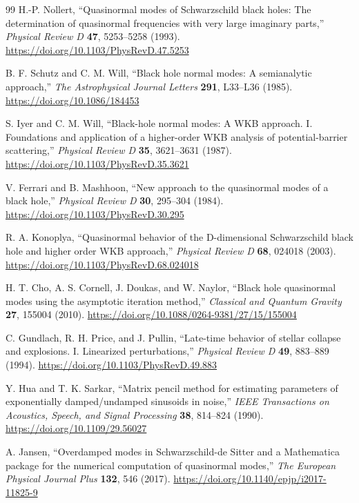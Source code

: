 \documentclass[12pt,a4paper]{article}
\begin{document}
\begin{thebibliography}{99}
\color{blue}
H.-P. Nollert,
``Quasinormal modes of Schwarzschild black holes: The determination of
quasinormal frequencies with very large imaginary parts,''
\emph{Physical Review D} \textbf{47}, 5253--5258 (1993).
\url{https://doi.org/10.1103/PhysRevD.47.5253}

B. F. Schutz and C. M. Will,
``Black hole normal modes: A semianalytic approach,''
\emph{The Astrophysical Journal Letters} \textbf{291}, L33--L36 (1985).
\url{https://doi.org/10.1086/184453}

S. Iyer and C. M. Will,
``Black-hole normal modes: A WKB approach. I. Foundations and application of
a higher-order WKB analysis of potential-barrier scattering,''
\emph{Physical Review D} \textbf{35}, 3621--3631 (1987).
\url{https://doi.org/10.1103/PhysRevD.35.3621}

V. Ferrari and B. Mashhoon,
``New approach to the quasinormal modes of a black hole,''
\emph{Physical Review D} \textbf{30}, 295--304 (1984).
\url{https://doi.org/10.1103/PhysRevD.30.295}

R. A. Konoplya,
``Quasinormal behavior of the D-dimensional Schwarzschild black hole and higher order WKB approach,''
\emph{Physical Review D} \textbf{68}, 024018 (2003).
\url{https://doi.org/10.1103/PhysRevD.68.024018}

H. T. Cho, A. S. Cornell, J. Doukas, and W. Naylor,
``Black hole quasinormal modes using the asymptotic iteration method,''
\emph{Classical and Quantum Gravity} \textbf{27}, 155004 (2010).
\url{https://doi.org/10.1088/0264-9381/27/15/155004}

C. Gundlach, R. H. Price, and J. Pullin,
``Late-time behavior of stellar collapse and explosions. I. Linearized
perturbations,''
\emph{Physical Review D} \textbf{49}, 883--889 (1994).
\url{https://doi.org/10.1103/PhysRevD.49.883}

Y. Hua and T. K. Sarkar,
``Matrix pencil method for estimating parameters of exponentially
damped/undamped sinusoids in noise,''
\emph{IEEE Transactions on Acoustics, Speech, and Signal Processing}
\textbf{38}, 814--824 (1990).
\url{https://doi.org/10.1109/29.56027}

\color{black}
A. Jansen,
``Overdamped modes in Schwarzschild-de Sitter and a Mathematica package for the numerical computation of quasinormal modes,''
\emph{The European Physical Journal Plus} \textbf{132}, 546 (2017).
\url{https://doi.org/10.1140/epjp/i2017-11825-9}


\end{thebibliography}
\end{document}
